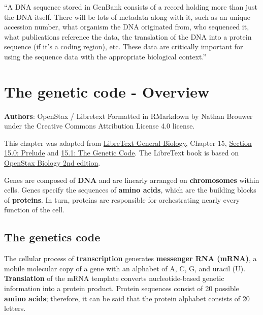 \documentclass[
]{book}
\begin{document}
``A DNA sequence stored in GenBank consists of a record holding more than just the DNA itself. There will be lots of metadata along with it, such as an unique accession number, what organism the DNA originated from, who sequenced it, what publications reference the data, the translation of the DNA into a protein sequence (if it's a coding region), etc. These data are critically important for using the sequence data with the appropriate biological context.''

\hypertarget{genetic-code}{%
\section{The genetic code - Overview}\label{genetic-code}}

\textbf{Authors}: OpenStax / Libretext Formatted in RMarkdown by Nathan
Brouwer under the Creative Commons Attribution License 4.0 license.

This chapter was adapted from \href{https://bio.libretexts.org/Bookshelves/Introductory_and_General_Biology/Book\%3A_General_Biology_(OpenStax)}{LibreText General
Biology},
Chapter 15, \href{https://bio.libretexts.org/Bookshelves/Introductory_and_General_Biology/Book\%3A_General_Biology_(OpenStax)/3\%3A_Genetics/15\%3A_Genes_and_Proteins/15.0\%3A_Prelude_to_Genes_and_Proteins}{Section 15.0: Prelude} and \href{https://bio.libretexts.org/Bookshelves/Introductory_and_General_Biology/Book\%3A_General_Biology_(OpenStax)/3\%3A_Genetics/15\%3A_Genes_and_Proteins/15.1\%3A_The_Genetic_Code}{15.1: The Genetic Code}.
The LibreText book is based on \href{https://openstax.org/details/books/biology-2e}{OpenStax Biology 2nd
edition}.

Genes are composed of \textbf{DNA} and are linearly arranged on \textbf{chromosomes} within cells. Genes specify the sequences of \textbf{amino acids}, which are the building blocks of \textbf{proteins}. In turn, proteins are responsible for orchestrating nearly every function of the cell.

\hypertarget{the-genetics-code}{%
\subsection{The genetics code}\label{the-genetics-code}}

The cellular process of \textbf{transcription} generates \textbf{messenger RNA (mRNA)}, a mobile molecular copy of a gene with an alphabet of A, C, G, and uracil (U). \textbf{Translation} of the mRNA template converts nucleotide-based genetic information into a protein product. Protein sequences consist of 20 possible \textbf{amino acids}; therefore, it can be said that the protein alphabet consists of 20 letters.
\end{document}
